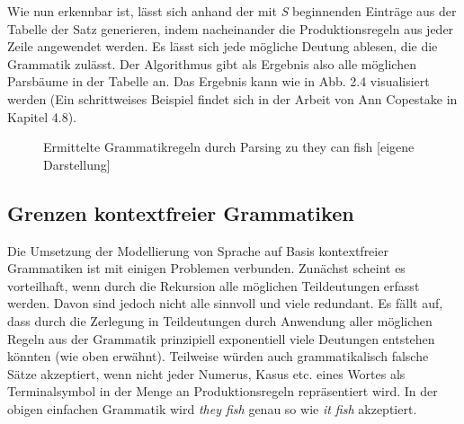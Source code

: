\documentclass[12pt]{report}
\begin{document}
Wie nun erkennbar ist, lässt sich anhand der mit \textit{S} beginnenden Einträge aus der Tabelle der Satz generieren, indem nacheinander die Produktionsregeln aus jeder Zeile angewendet werden. Es lässt sich jede mögliche Deutung ablesen, die die Grammatik zulässt. Der Algorithmus gibt als Ergebnis also alle möglichen Parsbäume in der Tabelle an. Das Ergebnis kann wie in Abb. 2.4 visualisiert werden (Ein schrittweises Beispiel findet sich in der Arbeit von Ann Copestake \cite{cop04} in Kapitel 4.8).
\begin{figure}[h!]
\begin{center}
\caption{Ermittelte Grammatikregeln durch Parsing zu \glqq  they can fish\grqq{} [eigene Darstellung]}
\end{center}
\end{figure}

\subsection{Grenzen kontextfreier Grammatiken}
Die Umsetzung der Modellierung von Sprache auf Basis kontextfreier Grammatiken ist mit einigen Problemen verbunden. Zunächst scheint es vorteilhaft, wenn durch die Rekursion alle möglichen Teildeutungen erfasst werden. Davon sind jedoch nicht alle sinnvoll und viele redundant. Es fällt auf, dass durch die Zerlegung in Teildeutungen durch Anwendung aller möglichen Regeln aus der Grammatik prinzipiell exponentiell viele Deutungen entstehen könnten (wie oben erwähnt). Teilweise würden auch grammatikalisch falsche Sätze akzeptiert, wenn nicht jeder Numerus, Kasus etc. eines Wortes als Terminalsymbol in der Menge an Produktionsregeln repräsentiert wird. In der obigen einfachen Grammatik wird \textit{\glqq  they fish\grqq{}} genau so wie \textit{\glqq  it fish\grqq{}} akzeptiert. 
\end{document}
